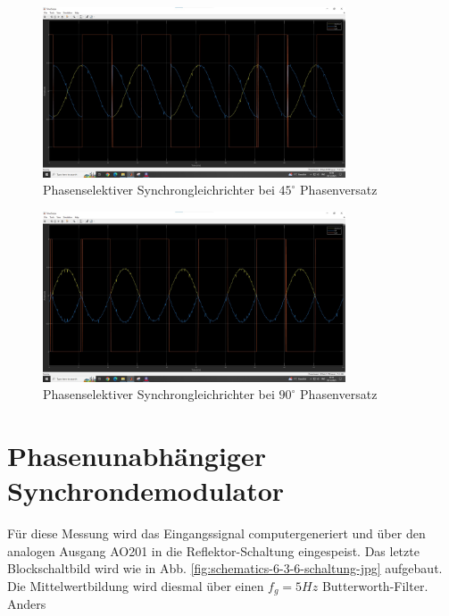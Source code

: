 \documentclass[a4paper]{article}
\begin{document}
\begin{figure}[h]
    \centering
    \includegraphics[width=0.8\textwidth]{images/6.3.5)gleichrichter_45gradv2.jpg}
    \caption{Phasenselektiver Synchrongleichrichter bei $45^\circ$ Phasenversatz}
    \label{fig:images-6-3-5-gleichrichter_45gradv2-jpg}
\end{figure}

\begin{figure}[h]
    \centering
    \includegraphics[width=0.8\textwidth]{images/6.3.5)gleichrichter_90gradv2.jpg}
    \caption{Phasenselektiver Synchrongleichrichter bei $90^\circ$ Phasenversatz}
    \label{fig:images-6-3-5-gleichrichter_90gradv2-jpg}
\end{figure}

\section{Phasenunabhängiger Synchrondemodulator}
Für diese Messung wird das Eingangssignal computergeneriert und über den analogen Ausgang
AO201 in die Reflektor-Schaltung eingespeist. Das letzte Blockschaltbild wird wie
in Abb. \ref{fig:schematics-6-3-6-schaltung-jpg} aufgebaut. Die Mittelwertbildung
wird diesmal über einen $f_{g}=5\unit{Hz}$ Butterworth-Filter. Anders 
\end{document}
